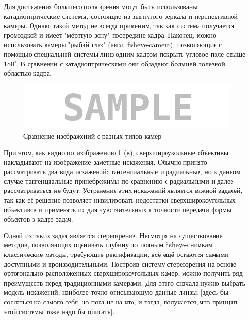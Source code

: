 Для достижения большего поля зрения могут быть использованы катадиоптрические системы, состоящие из выгнутого зеркала и 
перспективной камеры. Однако такой метод не всегда применим, так как система получается громоздкой и имеет "мёртвую зону" посередине 
кадра. Наконец, можно использовать камеры "рыбий глаз" (англ. fisheye-camera), позволяющие с помощью специальной системы линз 
одним кадром покрыть угловое поле свыше $180^\circ$. В сравнении с катадиоптрическими они обладают большей полезной областью кадра. %

\begin{figure}[H]
	\begin{center}
		\includegraphics[scale=0.5]{pics/sample.png}
		\caption{Сравнение изображений с разных типов камер} 
		\label{pic:epipol} %
	\end{center}
\end{figure}

При этом, как видно по изображению \ref{pic:epipol} (в), сверхшироукольные объективы накладывают на изображение заметные искажения.
Обычно принято рассматривать два вида искажений: тангенциальные и радиальные, но в данном случае тангенциальные принебрежимы по сравнению
 с радиальными и далее рассматриваться не будут. Устранение этих искажений является важной задачей, так как её решение позволяет 
 нивилировать недостатки сверхширокоугольных объективов и применять их для чувствительных к точности передачи формы объектов в кадре задач.

 Одной из таких задач является стереозрение. Несмотря на существование методов, позволяющих оценивать глубину по полным fisheye-снимкам \cite{full_fisheye_stereo}, 
классические методы, требующие ректификации, всё ещё остаются самыми доступными и производительными. Построив систему стереозрения на 
основе ортогонально расположенных сверхширокоугольных камер, можно получить ряд преимуществ перед традиционными камерами. Для этого 
сначала нужно выбрать модель искажений, наиболее точно описывающую данные линзы. [здесь бы сослаться на самого себя, но пока не на что,
и тогда, получается, что принцип этой системы тоже надо бы описать].

